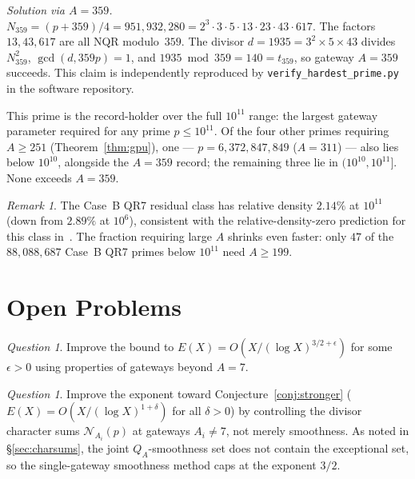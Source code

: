 \documentclass[12pt]{amsart}
\theoremstyle{definition}
\theoremstyle{remark}
\newtheorem{remark}[theorem]{Remark}
\newtheorem{question}[theorem]{Question}
\begin{document}
\medskip
\noindent\textit{Solution via $A = 359$.}
$N_{359} = (p + 359)/4 = 951{,}932{,}280
        = 2^3 \cdot 3 \cdot 5 \cdot 13 \cdot 23 \cdot 43 \cdot 617.$
The factors $13, 43, 617$ are all NQR modulo~$359$.
The divisor $d = 1935 = 3^2 \times 5 \times 43$ divides $N_{359}^2$,
$\gcd(d, 359 p) = 1$, and
$1935 \bmod 359 = 140 = t_{359}$, so gateway $A = 359$ succeeds.
This claim is independently reproduced by
\texttt{verify\_hardest\_prime.py} in the software repository.

\medskip
\noindent
This prime is the record-holder over the full $10^{11}$ range: the
largest gateway parameter required for any prime $p \le 10^{11}$.
Of the four other primes requiring $A \ge 251$ (Theorem~\ref{thm:gpu}),
one --- $p = 6{,}372{,}847{,}849$ ($A = 311$) --- also lies below
$10^{10}$, alongside the $A = 359$ record; the remaining three lie in
$(10^{10}, 10^{11}]$. None exceeds $A = 359$.

\begin{remark}
The Case~B QR7 residual class has relative density $2.14\%$ at $10^{11}$
(down from $2.89\%$ at $10^6$), consistent with the
relative-density-zero prediction for this class in~\cite{ES-paper}.
The fraction requiring large $A$ shrinks even faster: only $47$ of the
$88{,}088{,}687$ Case~B QR7 primes below $10^{11}$ need $A \ge 199$.
\end{remark}

\section{Open Problems}\label{sec:open}

\begin{question}
Improve the bound to $E(X) = O(X/(\log X)^{3/2+\epsilon})$
for some $\epsilon > 0$ using properties of gateways beyond $A=7$.
\end{question}

\begin{question}
Improve the exponent toward Conjecture~\ref{conj:stronger}
($E(X) = O(X/(\log X)^{1+\delta})$ for all $\delta > 0$) by controlling
the divisor character sums $\mathcal{N}_{A_i}(p)$ at gateways $A_i \ne 7$,
not merely smoothness. As noted in \S\ref{sec:charsums}, the joint
$Q_A$-smoothness set does not contain the exceptional set, so the
single-gateway smoothness method caps at the exponent $3/2$.
\end{question}
\end{document}
